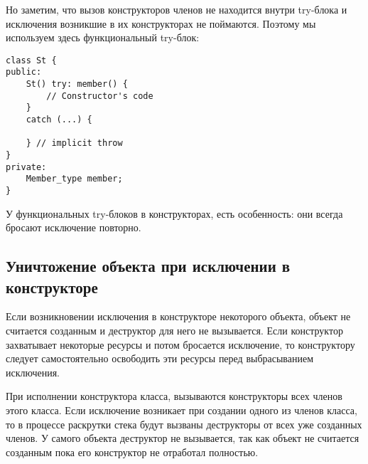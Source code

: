 Но заметим, что вызов конструкторов членов не находится внутри try-блока и исключения возникшие в их конструкторах не поймаются.
Поэтому мы используем здесь функциональный try-блок:

\begin{verbatim}
class St {
public:
    St() try: member() {
        // Constructor's code
    }
    catch (...) {

    } // implicit throw
}
private:
    Member_type member;
}
\end{verbatim}

У функциональных try-блоков в конструкторах, есть особенность: они всегда бросают исключение повторно.

\subsection{Уничтожение объекта при исключении в конструкторе}

Если возникновении исключения в конструкторе некоторого объекта, объект не считается созданным и деструктор для него не вызывается. Если конструктор захватывает некоторые ресурсы и потом бросается исключение, то конструктору следует самостоятельно освободить эти ресурсы перед выбрасыванием исключения.

При исполнении конструктора класса, вызываются конструкторы всех членов этого класса. Если исключение возникает при создании одного из членов класса, то в процессе раскрутки стека будут вызваны деструкторы от всех уже созданных членов. У самого объекта деструктор не вызывается, так как объект не считается созданным пока его конструктор не отработал полностью.

